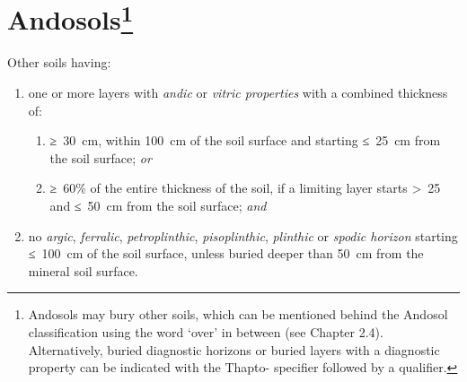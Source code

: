 \documentclass[
  letterpaper,
  DIV=11,
  numbers=noendperiod]{scrreprt}
\providecommand{\tightlist}{%
  \setlength{\itemsep}{0pt}\setlength{\parskip}{0pt}}\usepackage{longtable,booktabs,array}
\begin{document}

\hypertarget{key-andosols}{%
\chapter[Andosols]{\texorpdfstring{Andosols\footnote{Andosols may bury
  other soils, which can be mentioned behind the Andosol classification
  using the word `over' in between (see Chapter 2.4). Alternatively,
  buried diagnostic horizons or buried layers with a diagnostic property
  can be indicated with the Thapto- specifier followed by a qualifier.}}{Andosols}}\label{key-andosols}}

Other soils having:

\begin{enumerate}
\def\labelenumi{\arabic{enumi}.}
\item
  one or more layers with \emph{andic} or \emph{vitric properties} with
  a combined thickness of:

  \begin{enumerate}
  \def\labelenumii{\alph{enumii}.}
  \tightlist
  \item
    ≥~30~cm, within 100~cm of the soil surface and starting ≤~25~cm from
    the soil surface; \emph{or}
  \item
    ≥~60\% of the entire thickness of the soil, if a limiting layer
    starts \textgreater~25 and ≤~50~cm from the soil surface; \emph{and}
  \end{enumerate}
\item
  no \emph{argic}, \emph{ferralic}, \emph{petroplinthic},
  \emph{pisoplinthic}, \emph{plinthic} or \emph{spodic horizon} starting
  ≤~100~cm of the soil surface, unless buried deeper than 50~cm from the
  mineral soil surface.
\end{enumerate}
\end{document}
